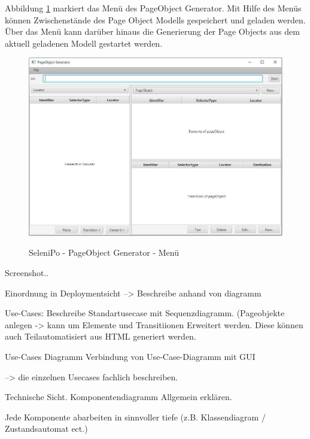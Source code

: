 \newpage

Abbildung \ref{fig:poGeneratorMenu} markiert das Menü des PageObject Generator. Mit Hilfe des Menüs können Zwischenstände des Page Object Modells gespeichert und geladen werden.
Über das Menü kann darüber hinaus die Generierung der Page Objects aus dem aktuell geladenen Modell gestartet werden.

\begin{figure}[htb]
  \centering  
  \includegraphics[scale=0.5]{img/poGeneratorMenu.JPG}\\
  \caption{SeleniPo - PageObject Generator - Menü}
  \label{fig:poGeneratorMenu}
\end{figure}

\newpage




Screenshot..

Einordnung in Deploymentsicht
--> Beschreibe anhand von diagramm

Use-Cases: Beschreibe Standartusecase mit Sequenzdiagramm. (Pageobjekte anlegen -> kann um Elemente und Transitiionen Erweitert werden. Diese können auch Teilautomatisiert aus HTML generiert werden.

Use-Cases Diagramm 
Verbindung von Use-Case-Diagramm mit GUI

--> die einzelnen Usecases fachlich beschreiben.

Technische Sicht. 
Komponentendiagramm Allgemein erklären.

Jede Komponente abarbeiten in sinnvoller tiefe (z.B. Klassendiagram / Zustandsautomat ect.)





